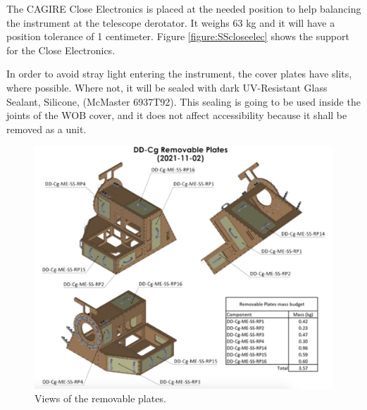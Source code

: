 \documentclass{report}
\begin{document}
The CAGIRE Close Electronics is placed at the needed position to help balancing the instrument at the telescope derotator. It weighs 63 kg and it will have a position tolerance of 1 centimeter. Figure \ref{figure:SScloseelec} shows the support for the Close Electronics.

In order to avoid stray light entering the instrument, the cover plates have slits, where possible. Where not, it will be sealed with dark UV-Resistant Glass Sealant, Silicone, (McMaster 6937T92). This sealing is going to be used inside the joints of the WOB cover, and it does not affect accessibility because it shall be removed as a unit.

\begin{figure}
\centering
\includegraphics[width=1\linewidth]{figures/SSremovable.png}
\caption{Views of the removable plates.}
\label{figure:SSremovable}
\end{figure}
\end{document}
